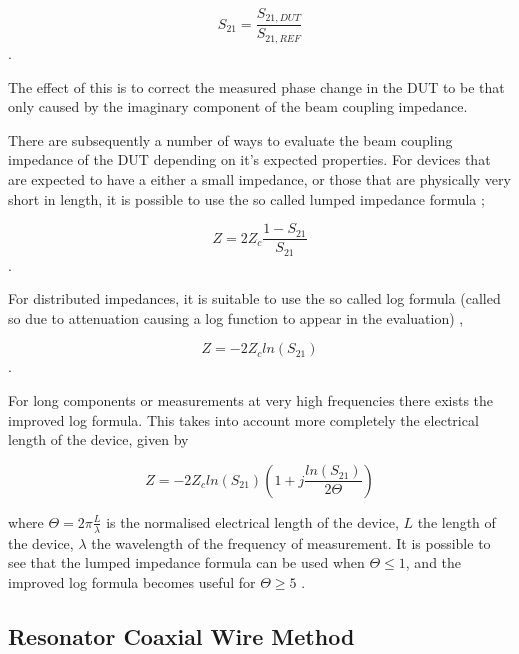 \documentclass[12pt,a4paper,twopage,openright]{article}
\begin{document}
\begin{equation}
S_{21} = \frac{S_{21,DUT}}{S_{21,REF}}
\end{equation}.

The effect of this is to correct the measured phase change in the DUT to be that only caused by the imaginary component of the beam coupling impedance.

There are subsequently a number of ways to evaluate the beam coupling impedance of the DUT depending on it's expected properties. For devices that are expected to have a either a small impedance, or those that are physically very short in length, it is possible to use the so called lumped impedance formula \cite{Hahn:BenchMeasInter, Hahn: ValidityImpMeas};

\begin{equation}
Z = 2Z_{c} \frac{1-S_{21}}{S_{21}}
\end{equation}.

For distributed impedances, it is suitable to use the so called log formula (called so due to attenuation causing a log function to appear in the evaluation) \cite{Hahn:BenchMeasInter, Hahn: ValidityImpMeas, Jensen:ImprovLogForm},

\begin{equation}
Z = -2Z_{c} ln \left( S_{21} \right)
\end{equation}.

For long components or measurements at very high frequencies there exists the improved log formula. This takes into account more completely the electrical length of the device, given by

\begin{equation}
Z = -2Z_{c} ln \left( S_{21}  \right) \left( 1 + j\frac{ln \left( S_{21}\right) }{2\Theta}  \right)
\end{equation}

where $\Theta = 2\pi \frac{L}{\lambda}$ is the normalised electrical length of the device, $L$ the length of the device, $\lambda$ the wavelength of the frequency of measurement. It is possible to see that the lumped impedance formula can be used when $\Theta \leq 1$, and the improved log formula becomes useful for $\Theta \geq 5$ \cite{Jensen:ImprovLogForm}.




\subsection{Resonator Coaxial Wire Method}
\label{sec:reson-coax-meth}
\end{document}
